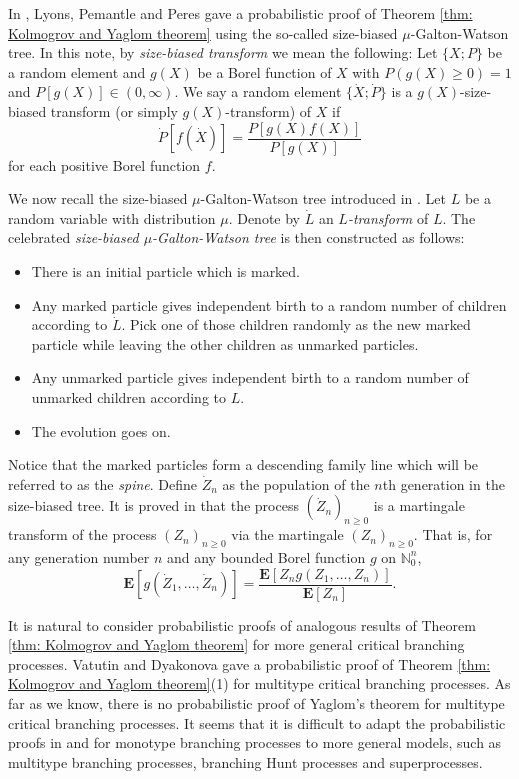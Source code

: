\documentclass[12pt,a4paper]{amsart}
\numberwithin{equation}{section}
\begin{document}
	In \cite{lyons1995conceptual}, Lyons, Pemantle and Peres gave a probabilistic proof of Theorem \ref{thm: Kolmogrov and Yaglom theorem} using the so-called size-biased $\mu$-Galton-Watson tree.
	In this note, by \emph{size-biased transform} we mean the following:
	Let $\{X;P\}$ be a random element and $g(X)$ be a Borel function of $X$ with $P(g(X) \geq 0) = 1$ and $P[g(X)]\in (0,\infty)$.
	We say a random element $\{\dot X;\dot P\}$ is 
   a $g(X)$-size-biased transform (or simply $g(X)$-transform) of $X$ if
	\[
		\dot P[f(\dot X)] = \frac{ P[g(X)f(X)]}{P[g(X)]}
	\]
	for each positive Borel function $f$.

	We now recall the size-biased $\mu$-Galton-Watson tree introduced in \cite{lyons1995conceptual}.
	Let $L$ be a random variable with distribution $\mu$.
   Denote by $\dot L$ an \emph{$L$-transform} of $L$.
	The celebrated \emph{size-biased $\mu$-Galton-Watson tree} is then constructed as follows:
\begin{itemize}
\item
	There is an initial particle which is marked.
\item
	Any marked particle gives independent birth to a random number of children according to $\dot L$. Pick one of those children randomly as the new marked particle while leaving the other children as unmarked particles.
\item
	Any unmarked particle gives independent birth to a random number of unmarked children according to $L$.
\item
	The evolution goes on.
\end{itemize}

	Notice that the marked particles form a descending family line which will be referred to as the \emph{spine}.
	Define $\dot Z_n$ as the population of the $n$th generation in the size-biased tree.
	It is proved in \cite{lyons1995conceptual} that the process $(\dot Z_n)_{n\ge 0}$ is a martingale transform of the process $(Z_n)_{n\ge 0}$ via the martingale $(Z_n)_{n\ge 0}.$
	That is, for any generation number $n$ and any bounded Borel function $g$ on $\mathbb N_0^{n}$,
\begin{equation}
\label{eq:htransformation}
	\mathbf E [ g ( \dot Z_1, \dots, \dot Z_n) ]
	= \frac { \mathbf E[ Z_n g( Z_1, \dots, Z_n)]} {\mathbf E [ Z_n]}.
\end{equation}

	It is natural to consider probabilistic proofs of analogous results of Theorem \ref{thm: Kolmogrov and Yaglom theorem} for more general critical branching processes.
	Vatutin and  Dyakonova \cite{VD} gave a probabilistic proof of Theorem \ref{thm: Kolmogrov and Yaglom theorem}(1) for multitype critical branching processes.
	As far as we know, there is no probabilistic proof of Yaglom's theorem for multitype critical branching processes.
	It seems that it is difficult to adapt the probabilistic proofs in \cite{geiger2000new} and \cite{lyons1995conceptual} for monotype branching processes to more general models, such as multitype branching processes, branching Hunt processes and superprocesses.
\end{document}

